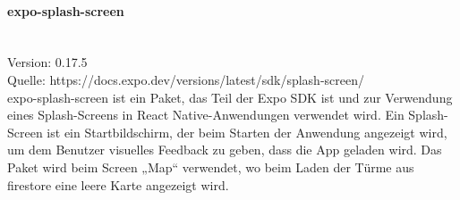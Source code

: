 \paragraph{expo-splash-screen}\mbox{}\\
Version: 0.17.5\\
Quelle: https://docs.expo.dev/versions/latest/sdk/splash-screen/\\
expo-splash-screen ist ein Paket, das Teil der Expo \ac{SDK} ist und zur Verwendung eines Splash-Screens in React Native-Anwendungen verwendet wird. Ein Splash-Screen ist ein Startbildschirm, der beim Starten der Anwendung angezeigt wird, um dem Benutzer visuelles Feedback zu geben, dass die App geladen wird.
\noindent Das Paket wird beim Screen „Map“ verwendet, wo beim Laden der Türme aus firestore eine leere Karte angezeigt wird.
\bigskip
